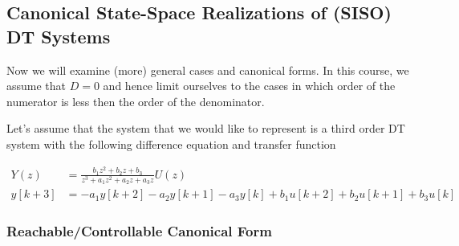 \documentclass[twoside]{article}
\begin{document}
\subsection{Canonical State-Space Realizations of (SISO) DT Systems}

Now we will examine (more) general cases and canonical
forms. In this course, we assume that $D=0$ and hence limit ourselves
to the cases in which order of the numerator is less then the order of
the denominator. 

Let's assume that the system that we would
like to represent is a third order DT system with the following difference equation
and transfer function

\begin{align*}
Y(z) &= \frac{b_1 z^2 + b_2 z + b_3}{z^3+ a_1
       z^2 + a_2 z + a_3 z} U(z)
\\
y[k+3] &=  -a_1 y[k+2] - a_2 y[k+1] - a_3 y[k] 
+ b_1 u[k+2] + b_2 u[k+1] + b_3 u[k] 
\end{align*}

\subsubsection*{Reachable/Controllable Canonical Form}
\end{document}
